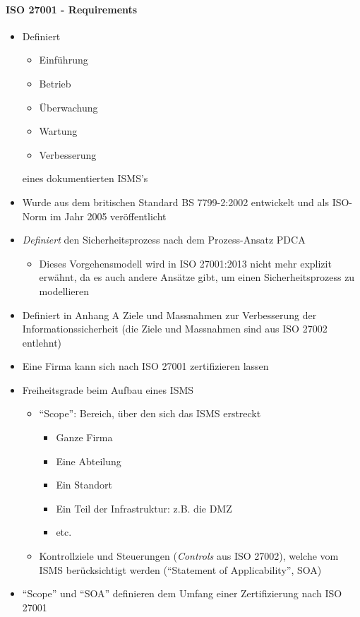 \documentclass[10pt,a4paper]{article}
\begin{document}
\paragraph*{ISO 27001 - Requirements}\label{para:ISO 27001}
\begin{itemize}[noitemsep,topsep=0pt,leftmargin=*]
    \item Definiert
    \begin{itemize}[noitemsep,topsep=0pt,leftmargin=*]
        \item Einführung
        \item Betrieb
        \item Überwachung
        \item Wartung
        \item Verbesserung
    \end{itemize}
    eines dokumentierten ISMS's
    \item Wurde aus dem britischen Standard BS 7799-2:2002 entwickelt und als ISO-Norm im Jahr 2005 veröffentlicht
    \item \textsl{Definiert} den Sicherheitsprozess nach dem Prozess-Ansatz PDCA
    \begin{itemize}[noitemsep,topsep=0pt,leftmargin=*]
        \item Dieses Vorgehensmodell wird in ISO 27001:2013 nicht mehr explizit erwähnt, da es auch andere Ansätze gibt, um einen Sicherheitsprozess zu modellieren
    \end{itemize}
    \item Definiert in Anhang A Ziele und Massnahmen zur Verbesserung der Informationssicherheit (die Ziele und Massnahmen sind aus ISO 27002 entlehnt)
    \item Eine Firma kann sich nach ISO 27001 zertifizieren lassen
    \item Freiheitsgrade beim Aufbau eines ISMS
    \begin{itemize}[noitemsep,topsep=0pt,leftmargin=*]
        \item "`Scope"': Bereich, über den sich das ISMS erstreckt
        \begin{itemize}[noitemsep,topsep=0pt,leftmargin=*]
            \item Ganze Firma
            \item Eine Abteilung
            \item Ein Standort
            \item Ein Teil der Infrastruktur: z.B. die DMZ
            \item etc.
        \end{itemize}
        \item Kontrollziele und Steuerungen (\textsl{Controls} aus ISO 27002), welche vom ISMS berücksichtigt werden ("`Statement of Applicability"', SOA)
    \end{itemize}
    \item "`Scope"' und "`SOA"' definieren dem Umfang einer Zertifizierung nach ISO 27001
\end{itemize}
\end{document}
